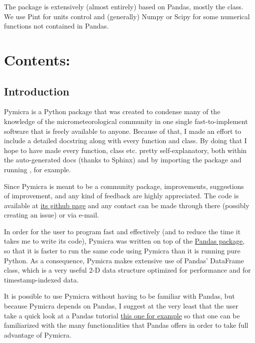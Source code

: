 \documentclass[a4paper,10pt,english]{sphinxmanual}
\begin{document}
The package is extensively (almost entirely) based on Pandas, mostly the
 class. We use Pint for units control and (generally) Numpy
or Scipy for some numerical functions not contained in Pandas.


\chapter{Contents:}
\label{index:pymicra-a-python-tool-for-micrometeorological-analyses}\label{index:contents}

\section{Introduction}
\label{intro:introduction}\label{intro::doc}
Pymicra is a Python package that was created to condense many of the knowledge
of the micrometeorological community in one single fast-to-implement software
that is freely available to anyone. Because of that, I made an effort to
include a detailed docstring along with every function and class. By doing that
I hope to have made every function, class etc. pretty self-explanatory, both
within the auto-generated docs (thanks to Sphinx) and by importing the package
and running , for example.

Since Pymicra is meant to be a community package, improvements, suggestions of
improvement, and any kind of feedback are highly appreciated. The code is
available at \href{https://github.com/tomchor/pymicra}{its github page} and any contact can be made through there
(possibly creating an issue) or via e-mail.

In order for the user to program fast and effectively (and to reduce the time it
takes me to write its code), Pymicra was written on top of the
\href{http://pandas.pydata.org/}{Pandas package}, so that it is faster to run
the same code using Pymicra than it is running pure Python. As a consequence,
Pymicra makes extensive use of Pandas' DataFrame class, which is a very useful
2-D data structure optimized for performance and for timestamp-indexed data.

It is possible to use Pymicra without having to be familiar with Pandas, but
because Pymicra depends on Pandas, I suggest at the very least that the user
take a quick look at a Pandas tutorial
\href{http://pandas.pydata.org/pandas-docs/stable/10min.html}{this one for example}
so that one can be familiarized with the many functionalities that
Pandas offers in order to take full advantage of Pymicra.
\end{document}
